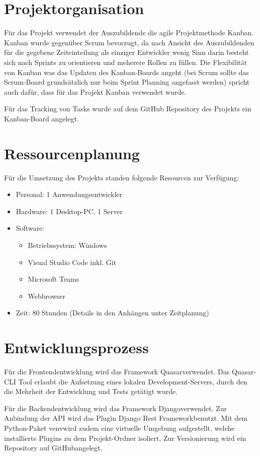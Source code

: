 \section{Projektorganisation}\label{sec:projektorganisation}
    Für das Projekt verwendet der Auszubildende die agile Projektmethode Kanban. Kanban wurde gegenüber Scrum bevorzugt, da nach Ansicht des Auszubildenden
    für die gegebene Zeiteinteilung als einziger Entwickler wenig Sinn darin besteht sich nach Sprints zu orientieren und meherere Rollen zu füllen. Die
    Flexibilität von Kanban was das Updaten des Kanban-Boards angeht (bei Scrum sollte das Scrum-Board grundsätzlich nur beim Sprint Planning angefasst werden)
    spricht auch dafür, dass für das Projekt Kanban verwendet wurde.

    \bigskip\noindent
    Für das Tracking von Tasks wurde auf dem GitHub Repository des Projekts ein Kanban-Board angelegt.

\section{Ressourcenplanung}\label{sec:resourcenplanung}
    Für die Umsetzung des Projekts standen folgende Resourcen zur Verfügung:

    \begin{itemize}
        \item Personal: 1 Anwendungsentwickler
        \item Hardware: 1 Desktop-PC, 1 Server
        \item Software: 
            \begin{itemize}
                \item Betriebssystem: Windows
                \item Visual Studio Code inkl. Git
                \item Microsoft Teams
                \item Webbrowser
            \end{itemize}
        \item Zeit: 80 Stunden (Details in den Anhängen unter \flqq Zeitplanung\frqq)
    \end{itemize}

    \section{Entwicklungsprozess}\label{sec:entwicklungsprozess}
        Für die Frontendentwicklung wird das Framework \flqq Quasar\frqq verwendet. Das Quasar-CLI Tool erlaubt die Aufsetzung eines lokalen Development-Servers,
        durch den die Mehrheit der Entwicklung und Tests getätigt wurde.

        \bigskip\noindent
        Für die Backendentwicklung wird das Framework \flqq Django\frqq verwendet.
        Zur Anbindung der API wird das Plugin \flqq Django Rest Framework\frqq benutzt.
        Mit dem Python-Paket \flqq venv\frqq wird zudem eine virtuelle Umgebung aufgestellt, welche installierte Plugins zu dem Projekt-Ordner isoliert.
        Zur Versionierung wird ein Repository auf \flqq GitHub\frqq angelegt.